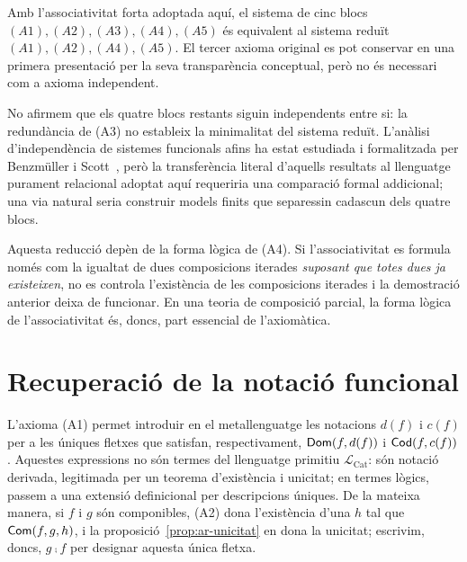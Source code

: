 \begin{corollari}
\label{cor:ar-equivalencia-sistemes}
Amb l'associativitat forta adoptada aquí, el sistema de cinc blocs $(A1),(A2),(A3),(A4),(A5)$ és equivalent al sistema reduït $(A1),(A2),(A4),(A5)$. El tercer axioma original es pot conservar en una primera presentació per la seva transparència conceptual, però no és necessari com a axioma independent.
\end{corollari}

No afirmem que els quatre blocs restants siguin independents entre si: la redundància de (A3) no estableix la minimalitat del sistema reduït. L'anàlisi d'independència de sistemes funcionals afins ha estat estudiada i formalitzada per Benzmüller i Scott~\cite{BS2020,BSAFP}, però la transferència literal d'aquells resultats al llenguatge purament relacional adoptat aquí requeriria una comparació formal addicional; una via natural seria construir models finits que separessin cadascun dels quatre blocs.

\begin{observacio}
Aquesta reducció depèn de la forma lògica de (A4). Si l'associativitat es formula només com la igualtat de dues composicions iterades \emph{suposant que totes dues ja existeixen}, no es controla l'existència de les composicions iterades i la demostració anterior deixa de funcionar. En una teoria de composició parcial, la forma lògica de l'associativitat és, doncs, part essencial de l'axiomàtica.
\end{observacio}

\section{Recuperació de la notació funcional}
\label{sec:ar-notacio-funcional}

L'axioma (A1) permet introduir en el metallenguatge les notacions $d(f)$ i $c(f)$ per a les úniques fletxes que satisfan, respectivament, $\mathsf{Dom}(f,d(f))$ i $\mathsf{Cod}(f,c(f))$. Aquestes expressions no són termes del llenguatge primitiu $\mathcal L_{\mathrm{Cat}}$: són notació derivada, legitimada per un teorema d'existència i unicitat; en termes lògics, passem a una extensió definicional per descripcions úniques. De la mateixa manera, si $f$ i $g$ són componibles, (A2) dona l'existència d'una $h$ tal que $\mathsf{Com}(f,g,h)$, i la proposició~\ref{prop:ar-unicitat} en dona la unicitat; escrivim, doncs, $g\comp f$ per designar aquesta única fletxa.

